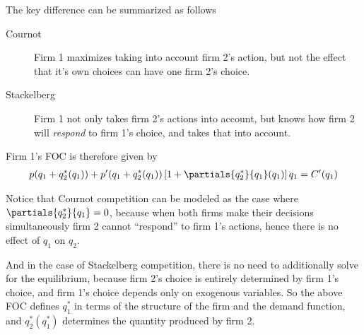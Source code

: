 The key difference can be summarized as follows
\begin{description}
    \item[Cournot] Firm 1 maximizes taking into account firm 2's action, but not the effect that it's own choices can have one firm 2's choice.
    \item[Stackelberg] Firm 1 not only takes firm 2's actions into account, but knows how firm 2 will \emph{respond} to firm 1's choice, and takes that into account.
\end{description}

Firm 1's FOC is therefore given by 
\begin{align*}
    p(q_1 + q_2^*(q_1)) + p'(q_1 + q_2^*(q_1))\left[1 + \partials{q_2^*}{q_1}(q_1)\right] q_1 = C'(q_1)
\end{align*}

Notice that Cournot competition can be modeled as the case where $\partials{q_2^*}{q_1} = 0$, because when both firms make their decisions simultaneously firm 2 cannot ``respond'' to firm 1's actions, hence there is no effect of $q_1$ on $q_2$. 

And in the case of Stackelberg competition, there is no need to additionally solve for the equilibrium, because firm 2's choice is entirely determined by firm 1's choice, and firm 1's choice depends only on exogenous variables. So the above FOC defines $q_1^*$ in terms of the structure of the firm and the demand function, and $q_2^*(q_1^*)$ determines the quantity produced by firm 2. 




